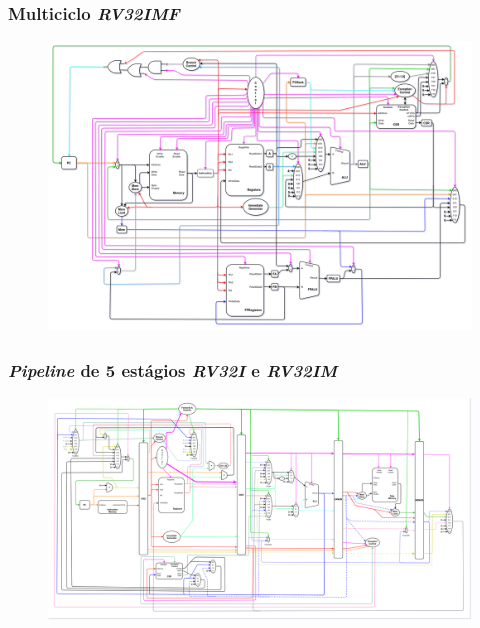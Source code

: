\documentclass[aspectratio=169]{beamer}
\begin{document}
    \begin{frame}
        \frametitle{Multiciclo \textit{RV32IMF}}
        \vfill
        \begin{figure}[H]
        \centering
            \includegraphics[width=.9\textwidth,height=.85\textheight,keepaspectratio]
            {../images/uarch_diagrams/multicycle-RV32IMF.png}
        \end{figure}
        \vfill
    \end{frame}

    \begin{frame}
        \frametitle{\textit{Pipeline} de 5 estágios \textit{RV32I} e \textit{RV32IM}}
        \vfill
        \begin{figure}[H]
        \centering
            \includegraphics[width=.99\textwidth,height=.85\textheight,keepaspectratio]
            {../images/uarch_diagrams/pipeline-RV32I-RV32IM.png}
        \end{figure}
        \vfill
    \end{frame}
\end{document}
